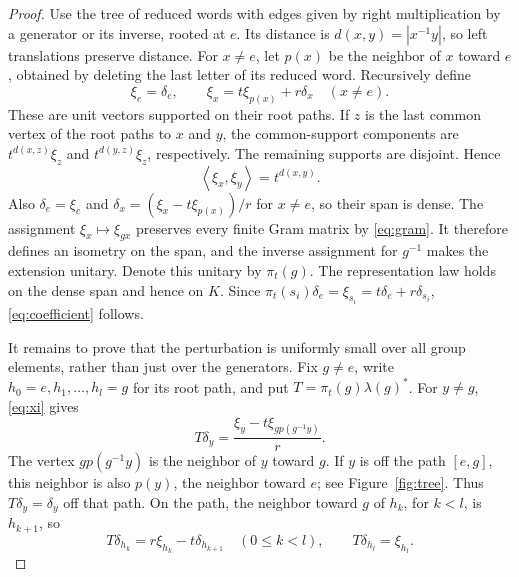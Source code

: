 \documentclass[11pt]{article}
\theoremstyle{definition}
\theoremstyle{remark}
\newcommand{\inner}[2]{\left\langle #1,#2\right\rangle}
\begin{document}
\begin{proof}
Use the tree of reduced words with edges given by right multiplication
by a generator or its inverse, rooted at $e$. Its distance is
$d(x,y)=|x^{-1}y|$, so left translations preserve distance. For $x\ne e$,
let $p(x)$ be the neighbor of $x$ toward $e$, obtained by deleting the last
letter of its reduced word. Recursively define
\begin{equation}\label{eq:xi}
\xi_e=\delta_e,\qquad \xi_x=t\xi_{p(x)}+r\delta_x\quad(x\ne e).
\end{equation}
These are unit vectors supported on their root paths. If $z$ is the last
common vertex of the root paths to $x$ and $y$, the common-support
components are $t^{d(x,z)}\xi_z$ and $t^{d(y,z)}\xi_z$, respectively.
The remaining supports are disjoint. Hence
\begin{equation}\label{eq:gram}
\inner{\xi_x}{\xi_y}=t^{d(x,y)}.
\end{equation}
Also $\delta_e=\xi_e$ and
$\delta_x=(\xi_x-t\xi_{p(x)})/r$ for $x\ne e$, so their span is dense.
The assignment $\xi_x\mapsto\xi_{gx}$ preserves every finite Gram
matrix by \eqref{eq:gram}. It therefore defines an isometry on the span,
and the inverse assignment for $g^{-1}$ makes the extension unitary.
Denote this unitary by $\pi_t(g)$. The representation law holds on the
dense span and hence on $K$. Since
$\pi_t(s_i)\delta_e=\xi_{s_i}=t\delta_e+r\delta_{s_i}$,
\eqref{eq:coefficient} follows.

It remains to prove that the perturbation is uniformly small over all
group elements, rather than just over the generators. Fix $g\ne e$,
write $h_0=e,h_1,\ldots,h_l=g$ for its root path, and put
$T=\pi_t(g)\lambda(g)^*$. For $y\ne g$, \eqref{eq:xi} gives
\begin{equation}\label{eq:Ty}
T\delta_y=\frac{\xi_y-t\xi_{g p(g^{-1}y)}}{r}.
\end{equation}
The vertex $g p(g^{-1}y)$ is the neighbor of $y$ toward $g$. If $y$ is
off the path $[e,g]$, this neighbor is also $p(y)$, the neighbor toward
$e$; see Figure~\ref{fig:tree}. Thus $T\delta_y=\delta_y$ off that path.
On the path, the neighbor toward $g$ of $h_k$, for $k<l$, is $h_{k+1}$,
so
\begin{equation}\label{eq:path-action}
T\delta_{h_k}=r\xi_{h_k}-t\delta_{h_{k+1}}\quad(0\le k<l),
\qquad T\delta_{h_l}=\xi_{h_l}.
\end{equation}


\end{proof}
\end{document}
